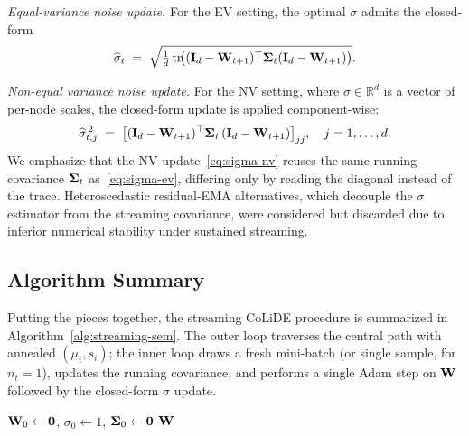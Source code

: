 \documentclass[journal,twoside]{IEEEtran}
\begin{document}
\textit{Equal-variance noise update.} For the EV setting, the optimal
$\sigma$ admits the closed-form
\begin{equation}
\label{eq:sigma-ev}
\widehat{\sigma}_t
\;=\;
\sqrt{
  \tfrac{1}{d}\,
  \mathrm{tr}\!\big( ({\mathbf I}_d - {\mathbf W}_{t+1})^\top
  \boldsymbol{\Sigma}_t ({\mathbf I}_d - {\mathbf W}_{t+1}) \big)
}.
\end{equation}

\textit{Non-equal variance noise update.} For the NV setting, where
$\sigma \in \mathbb{R}^d$ is a vector of per-node scales, the
closed-form update is applied component-wise:
\begin{equation}
\label{eq:sigma-nv}
\widehat{\sigma}_{t,j}^{\,2}
\;=\;
\big[ ({\mathbf I}_d - {\mathbf W}_{t+1})^\top
\boldsymbol{\Sigma}_t\,({\mathbf I}_d - {\mathbf W}_{t+1}) \big]_{jj},
\quad j = 1, \ldots, d.
\end{equation}
We emphasize that the NV update~\eqref{eq:sigma-nv} reuses the same
running covariance $\boldsymbol{\Sigma}_t$ as~\eqref{eq:sigma-ev}, differing
only by reading the diagonal instead of the trace. Heteroscedastic
residual-EMA alternatives, which decouple the $\sigma$ estimator from
the streaming covariance, were considered but discarded due to
inferior numerical stability under sustained streaming.

\subsection{Algorithm Summary}
\label{sec:colide-stream-algo}
Putting the pieces together, the streaming CoLiDE procedure is
summarized in Algorithm~\ref{alg:streaming-sem}. The outer loop
traverses the central path with annealed
$(\mu_i, s_i)$; the inner loop draws a fresh mini-batch (or
single sample, for $n_t = 1$), updates the running covariance, and
performs a single Adam step on ${\mathbf W}$ followed by the closed-form
$\sigma$ update.

\begin{algorithm}[t]
\caption{Streaming CoLiDE (SEM)}
\label{alg:streaming-sem}
\DontPrintSemicolon
{}
\KwOut{$\widehat{\bbW}$}
${\mathbf W}_0 \gets {\ensuremath{\mathbf 0}}$, $\sigma_0 \gets 1$,
$\boldsymbol{\Sigma}_0 \gets {\ensuremath{\mathbf 0}}$\;
\Return ${\mathbf W}$
\end{algorithm}
\end{document}
